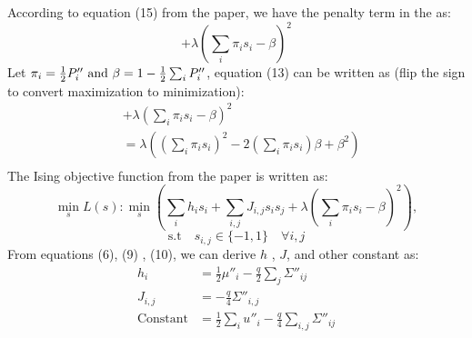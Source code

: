 \documentclass{article}
\begin{document}
According to equation (15) from the paper, we have the penalty term in the as:
\begin{equation}
    +\lambda \left(\sum_{i}^{}\pi_i s_i - \beta\right)^2 
\end{equation}
Let $\pi_i = \frac{1}{2} P''_i\) and \(\beta = 1-\frac{1}{2} \sum_{i}^{} P''_i $, equation (13) can be written as (flip the sign to convert maximization to minimization):
\begin{align}
    &+\lambda \left(\sum_{i}^{}\pi_i s_i - \beta\right)^2 \\
    &= \lambda \left(\left(\sum_{i}^{}\pi_i s_i\right)^2 - 2 \left(\sum_{i}^{}\pi_i s_i\right)\beta + \beta^2 \right) \\
\end{align}
The Ising objective function from the paper is written as:
\begin{equation}
    \min_{s} L(s) : \min_s \left(\sum_{i}^{}h_i s_i + \sum_{i,j}^{}J_{i,j} s_i s_j + \lambda \left(\sum_{i}^{}\pi_i s_i - \beta\right)^2\right),
\end{equation}
\begin{equation*}
    \text{s.t} \quad s_{i,j} \in \{-1, 1\} \quad \forall i,j
\end{equation*}
From equations (6), (9) , (10), we can derive $h$ , $J$, and other constant as:
\begin{align}
    h_i & = \frac{1}{2} \mu''_i -\frac{q}{2} \sum_{j}^{}\Sigma''_{ij}\\
    J_{i,j} & = -\frac{q}{4} \Sigma''_{i,j} \\
    \text{Constant} &= \frac{1}{2} \sum_{i}^{} u''_i - \frac{q}{4} \sum_{i,j}^{} \Sigma''_{ij} 
\end{align}
\end{document}
